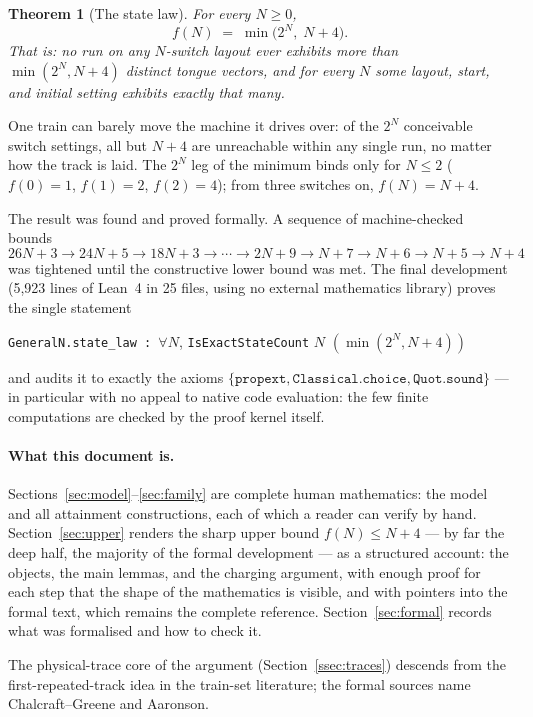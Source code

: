 \documentclass[11pt]{article}
\newtheorem{theorem}{Theorem}[section]
\theoremstyle{definition}
\newcommand{\lean}[1]{\texttt{#1}}
\begin{document}
\begin{theorem}[The state law]\label{thm:main}
  For every $N \ge 0$,
  \[ f(N) \;=\; \min\bigl(2^N,\; N+4\bigr). \]
  That is: no run on any $N$-switch layout ever exhibits more than
  $\min(2^N, N+4)$ distinct tongue vectors, and for every $N$ some layout,
  start, and initial setting exhibits exactly that many.
\end{theorem}

One train can barely move the machine it drives over: of the $2^N$
conceivable switch settings, all but $N+4$ are unreachable within any
single run, no matter how the track is laid.  The $2^N$ leg of the
minimum binds only for $N \le 2$ ($f(0)=1$, $f(1)=2$, $f(2)=4$); from
three switches on, $f(N) = N+4$.

The result was found and proved formally.  A sequence of machine-checked
bounds
\[ 26N{+}3 \to 24N{+}5 \to 18N{+}3 \to \cdots \to 2N{+}9 \to N{+}7 \to
   N{+}6 \to N{+}5 \to N{+}4 \]
was tightened until the constructive lower bound was met.  The final
development (5,923 lines of Lean~4 in 25 files, using no
external mathematics library) proves the single statement
\begin{center}
  \lean{GeneralN.state\_law :\ }$\forall N$,
  \lean{IsExactStateCount} $N$ $(\min(2^N, N+4))$
\end{center}
and audits it to exactly the axioms
$\{\lean{propext}, \lean{Classical.choice}, \lean{Quot.sound}\}$ ---
in particular with no appeal to native code evaluation: the few finite
computations are checked by the proof kernel itself.

\paragraph{What this document is.}
Sections~\ref{sec:model}--\ref{sec:family} are complete human
mathematics: the model and all attainment constructions, each of which a reader can
verify by hand.  Section~\ref{sec:upper} renders the sharp upper bound
$f(N) \le N+4$ --- by far the deep half, the majority of the formal development
--- as a structured account: the objects, the main lemmas, and the
charging argument, with enough proof for each step that the shape of the
mathematics is visible, and with pointers into the formal text, which
remains the complete reference.  Section~\ref{sec:formal} records what
was formalised and how to check it.

The physical-trace core of the argument (Section~\ref{ssec:traces})
descends from the first-repeated-track idea in the train-set literature;
the formal sources name Chalcraft--Greene and Aaronson.
\end{document}
